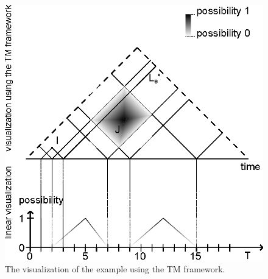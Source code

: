 \begin{figure}[h]
	\centering
	\includegraphics[width=0.9\columnwidth]{graphs/example_image.eps}
	\caption{The visualization of the example using the TM framework.}
	\label{fig:ex}
\end{figure}